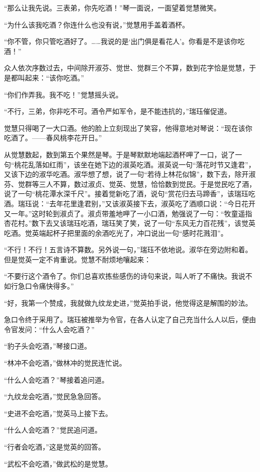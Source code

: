 \par “那么让我先说。三表弟，你先吃酒！”琴一面说，一面望着觉慧微笑。
\par “为什么该我吃酒？你连什么也没有说，”觉慧用手盖着酒杯。
\par “你不管，你只管吃酒好了。……我说的是‘出门俱是看花人’。你看是不是该你吃酒！”
\par 众人依次序数过去，中间除开淑芬、觉世、觉群三个不算，数到花字恰是觉慧，于是都叫起来：“该你吃酒。”
\par “你们作弄我。我不吃！”觉慧摇头说。
\par “不行，三弟，你非吃不可。酒令严如军令，是不能违抗的，”瑞珏催促道。
\par 觉慧只得喝了一大口酒。他的脸上立刻现出了笑容，他得意地对琴说：“现在该你吃酒了。——春风桃李花开日。”
\par 从觉慧数起，数到第五个果然是琴。于是琴默默地端起酒杯呷了一口，说了一句“桃花乱落如红雨”，该坐在她下边的淑英吃酒。淑英说一句“落花时节又逢君”，又该下边的淑华吃酒。淑华想了想，说了一句“若待上林花似锦”，数下去，除开淑芬、觉群等三人不算，数过淑贞、觉英、觉慧，恰恰数到觉民。于是觉民吃了酒，说了一句“桃花潭水深千尺”。接着觉新吃了酒，说句“赏花归去马蹄香”，该瑞珏吃酒。瑞珏说：“去年花里逢君别，”又该淑英接下去，淑英吃了酒顺口说：“今日花开又一年。”这时轮到淑贞了。淑贞带羞地呷了一小口酒，勉强说了一句：“牧童遥指杏花村。”数下去又该瑞珏吃酒，瑞珏笑了笑，说了一句“东风无力百花残”，该觉英吃酒。觉英端起杯子把里面的余酒吃光了，冲口说出一句“感时花溅泪”。
\par “不行！不行！五言诗不算数。另外说一句，”瑞珏不依地说。淑华在旁边附和着。但是觉英一定不肯重说。觉慧不耐烦地嚷起来：
\par “不要行这个酒令了。你们总喜欢拣些感伤的诗句来说，叫人听了不痛快。我说不如行急口令痛快得多。”
\par “好，我第一个赞成，我就做九纹龙史进，”觉英拍手说，他觉得这是解围的妙法。
\par 急口令终于采用了。瑞珏被推举为令官，在各人认定了自己充当什么人以后，便由令官发问：“什么人会吃酒？”
\par “豹子头会吃酒，”琴接口道。
\par “林冲不会吃酒，”做林冲的觉民连忙说。
\par “什么人会吃酒？”琴接着追问道。
\par “九纹龙会吃酒，”觉民急急回答。
\par “史进不会吃酒，”觉英马上接下去。
\par “什么人会吃酒？”觉民追问道。
\par “行者会吃酒，”这是觉英的回答。
\par “武松不会吃酒，”做武松的是觉慧。
